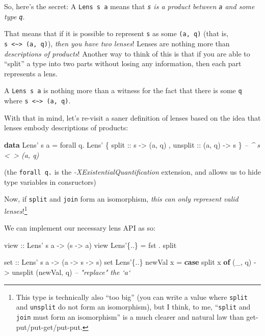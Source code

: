 \documentclass[]{article}
\newenvironment{Shaded}{}{}
\newcommand{\CommentTok}[1]{\textcolor[rgb]{0.38,0.63,0.69}{\textit{#1}}}
\newcommand{\DataTypeTok}[1]{\textcolor[rgb]{0.56,0.13,0.00}{#1}}
\newcommand{\FunctionTok}[1]{\textcolor[rgb]{0.02,0.16,0.49}{#1}}
\newcommand{\KeywordTok}[1]{\textcolor[rgb]{0.00,0.44,0.13}{\textbf{#1}}}
\newcommand{\NormalTok}[1]{#1}
\newcommand{\OtherTok}[1]{\textcolor[rgb]{0.00,0.44,0.13}{#1}}
\begin{document}
So, here's the secret: A \texttt{Lens\textquotesingle{}\ s\ a} means that
\emph{\texttt{s} is a product between \texttt{a} and some type \texttt{q}}.

That means that if it is possible to represent \texttt{s} as some
\texttt{(a,\ q)} (that is,
\texttt{s\ \textless{}\textasciitilde{}\textgreater{}\ (a,\ q)}), \emph{then you
have two lenses}! Lenses are nothing more than \emph{descriptions of products}!
Another way to think of this is that if you are able to ``split'' a type into
two parts without losing any information, then each part represents a lens.

A \texttt{Lens\textquotesingle{}\ s\ a} is nothing more than a witness for the
fact that there is some \texttt{q} where
\texttt{s\ \textless{}\textasciitilde{}\textgreater{}\ (a,\ q)}.

With that in mind, let's re-visit a saner definition of lenses based on the idea
that lenses embody descriptions of products:

\begin{Shaded}
\begin{Highlighting}[]
\KeywordTok{data} \DataTypeTok{Lens'}\NormalTok{ s a }\FunctionTok{=}\NormalTok{ forall q}\FunctionTok{.}
                 \DataTypeTok{Lens'}\NormalTok{ \{}\OtherTok{ split   ::}\NormalTok{ s }\OtherTok{->}\NormalTok{ (a, q)}
\NormalTok{                       ,}\OtherTok{ unsplit ::}\NormalTok{ (a, q) }\OtherTok{->}\NormalTok{ s}
\NormalTok{                       \}    }\CommentTok{-- ^ s <~> (a, q)}
\end{Highlighting}
\end{Shaded}

(the \texttt{forall\ q.} is the \emph{-XExistentialQuantification} extension,
and allows us to hide type variables in consructors)

Now, if \texttt{split} and \texttt{join} form an isomorphism, \emph{this can
only represent valid lenses}!\footnote{This type is technically also ``too big''
  (you can write a value where \texttt{split} and \texttt{unsplit} do not form
  an isomorphism), but I think, to me, ``\texttt{split} and \texttt{join} must
  form an isomorphism'' is a much clearer and natural law than
  get-put/put-get/put-put.}

We can implement our necessary lens API as so:

\begin{Shaded}
\begin{Highlighting}[]
\OtherTok{view ::} \DataTypeTok{Lens'}\NormalTok{ s a }\OtherTok{->}\NormalTok{ (s }\OtherTok{->}\NormalTok{ a)}
\NormalTok{view }\DataTypeTok{Lens'}\NormalTok{\{}\FunctionTok{..}\NormalTok{\} }\FunctionTok{=}\NormalTok{ fst }\FunctionTok{.}\NormalTok{ split}

\OtherTok{set ::} \DataTypeTok{Lens'}\NormalTok{ s a }\OtherTok{->}\NormalTok{ (a }\OtherTok{->}\NormalTok{ s }\OtherTok{->}\NormalTok{ s)}
\NormalTok{set }\DataTypeTok{Lens'}\NormalTok{\{}\FunctionTok{..}\NormalTok{\} newVal x }\FunctionTok{=} \KeywordTok{case}\NormalTok{ split x }\KeywordTok{of}
\NormalTok{    (_, q) }\OtherTok{->}\NormalTok{ unsplit (newVal, q)      }\CommentTok{-- "replace" the `a`}
\end{Highlighting}
\end{Shaded}
\end{document}
